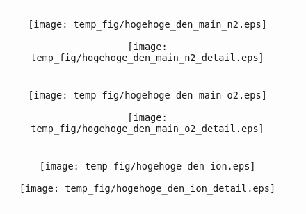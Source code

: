 \documentclass{jsarticle}
\begin{document}
   \begin{figure}[htbp]
    \begin{center}
    \begin{tabular}{cc}


       \begin{minipage}{0.5\hsize}
          \begin{center}
             \texttt{[image: temp\_fig/hogehoge\_den\_main\_n2.eps]}

          \end{center}
          \end{minipage}
       
          \begin{minipage}{0.5\hsize}
             \begin{center}
                \texttt{[image: temp\_fig/hogehoge\_den\_main\_n2\_detail.eps]}

             \end{center}
       \end{minipage}

       \\
       \begin{minipage}{0.5\hsize}
        \begin{center}
           \texttt{[image: temp\_fig/hogehoge\_den\_main\_o2.eps]}

        \end{center}
        \end{minipage}
     
        \begin{minipage}{0.5\hsize}
           \begin{center}
              \texttt{[image: temp\_fig/hogehoge\_den\_main\_o2\_detail.eps]}

           \end{center}
     \end{minipage}

     \\
       \begin{minipage}{0.5\hsize}
        \begin{center}
           \texttt{[image: temp\_fig/hogehoge\_den\_ion.eps]}

        \end{center}
        \end{minipage}
     
        \begin{minipage}{0.5\hsize}
           \begin{center}
              \texttt{[image: temp\_fig/hogehoge\_den\_ion\_detail.eps]}


\end{center}
\end{minipage}
\end{tabular}
\end{center}
\end{figure}
\end{document}
